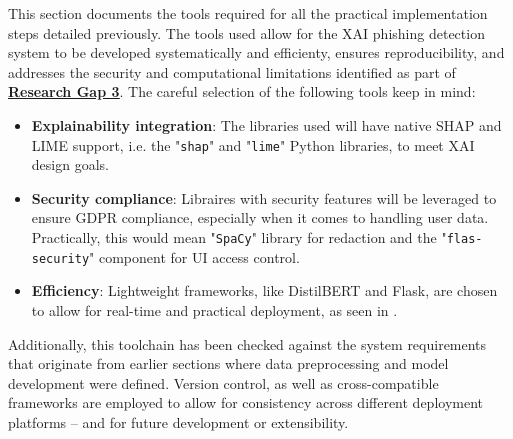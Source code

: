 
This section documents the tools required for all the practical implementation steps detailed previously. The tools used allow for the XAI phishing detection system to be developed systematically and efficienty, ensures reproducibility, and addresses the security and computational limitations identified as part of \hyperref[research-gap-3]{\uline{\textbf{Research Gap 3}}}. The careful selection of the following tools keep in mind:

\begin{itemize}
  \item \textbf{Explainability integration}: The libraries used will have native SHAP and LIME support, i.e. the "\texttt{shap}" and "\texttt{lime}" Python libraries, to meet XAI design goals.
  \item \textbf{Security compliance}: Libraires with security features will be leveraged to ensure GDPR compliance, especially when it comes to handling user data. Practically, this would mean "\texttt{SpaCy}" library for redaction and the "\texttt{flas-security}" component for UI access control.
  \item \textbf{Efficiency}: Lightweight frameworks, like DistilBERT and Flask, are chosen to allow for real-time and practical deployment, as seen in \cite{kapoor2024comparative}.
\end{itemize}

\noindent Additionally, this toolchain has been checked against the system requirements that originate from earlier sections where data preprocessing and model development were defined. Version control, as well as cross-compatible frameworks are employed to allow for consistency across different deployment platforms -- and for future development or extensibility.

